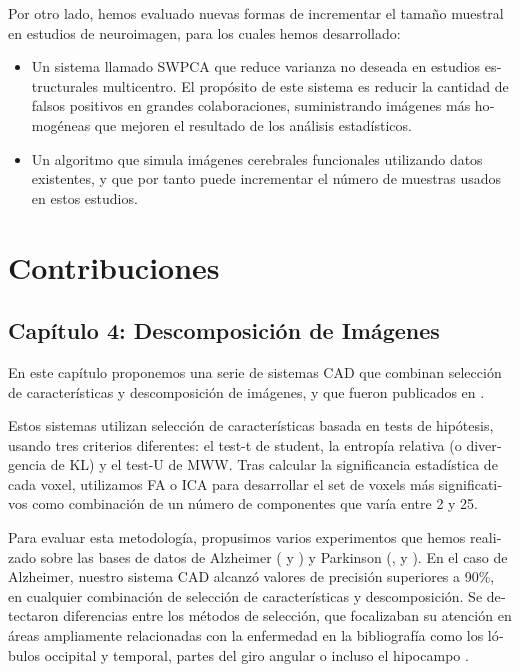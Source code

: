 \begin{otherlanguage}{spanish}
Por otro lado, hemos evaluado nuevas formas de incrementar el tamaño muestral en estudios de neuroimagen, para los cuales hemos desarrollado: 
\begin{itemize}
	\item Un sistema llamado \acf{SWPCA} que reduce varianza no deseada en estudios estructurales multicentro. El propósito de este sistema es reducir la cantidad de falsos positivos en grandes colaboraciones, suministrando imágenes más homogéneas que mejoren el resultado de los análisis estadísticos. 
	\item Un algoritmo que simula imágenes cerebrales funcionales utilizando datos existentes, y que por tanto puede incrementar el número de muestras usados en estos estudios.  
\end{itemize}

\section*{Contribuciones}
\subsection*{Capítulo 4: Descomposición de Imágenes}
En este capítulo proponemos una serie de sistemas \ac{CAD} que combinan selección de características y descomposición de imágenes, y que fueron publicados en \cite{Martinez201141,Martinez-Murcia20129676,Martinez-Murcia2013255,Martinez-Murcia201458}. 

Estos sistemas utilizan selección de características basada en tests de hipótesis, usando tres criterios diferentes: el test-t de student, la entropía relativa (o divergencia de \acf{KL}) y el test-U de \acf{MWW}. Tras calcular la significancia estadística de cada voxel, utilizamos \ac{FA} o \ac{ICA} para desarrollar el set de voxels más significativos como combinación de un número de componentes que varía entre 2 y 25. 

Para evaluar esta metodología, propusimos varios experimentos que hemos realizado sobre las bases de datos de Alzheimer (\adnipet{} y \vdlnhmpao{}) y Parkinson (\vdlndat{}, \vdlvdat{} y \ppmidat{}). En el caso de Alzheimer, nuestro sistema \ac{CAD} alcanzó valores de precisión superiores a 90\%, en cualquier combinación de selección de características y descomposición. Se detectaron diferencias entre los métodos de selección, que focalizaban su atención en áreas ampliamente relacionadas con la enfermedad en la bibliografía como los lóbulos occipital y temporal, partes del giro angular o incluso el hipocampo \cite{Dubois2007,Claus1994}. 


\end{otherlanguage}
